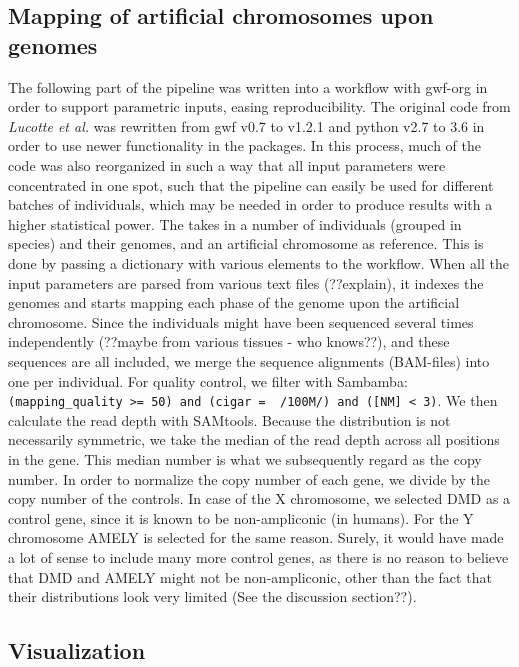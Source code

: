 \documentclass[
journal=jacsat, %
manuscript=article]{achemso}
\begin{document}
\normalsize


\subsection{Mapping of artificial chromosomes upon genomes}


The following part of the pipeline was written into a workflow with gwf-org\cite{gwforg} in order to support parametric inputs, easing reproducibility. The original code from \textit{Lucotte et al.\cite{LucotteDyn}} was rewritten from gwf v0.7 to v1.2.1 and python v2.7 to 3.6 in order to use newer functionality in the packages. In this process, much of the code was also reorganized in such a way that all input parameters were concentrated in one spot, such that the pipeline can easily be used for different batches of individuals, which may be needed in order to produce results with a higher statistical power. The takes in a number of individuals (grouped in species) and their genomes, and an artificial chromosome as reference. This is done by passing a dictionary with various elements to the workflow. When all the input parameters are parsed from various text files (??explain), it indexes the genomes and starts mapping each phase of the genome upon the artificial chromosome. Since the individuals might have been sequenced several times independently (??maybe from various tissues - who knows??), and these sequences are all included, we merge the sequence alignments (BAM-files) into one per individual. For quality control, we filter with Sambamba\cite{doi:10.1093/bioinformatics/btv098}: \texttt{(mapping\_quality >= 50) and (cigar =~ /100M/) and ([NM] < 3)}. We then calculate the read depth with SAMtools\cite{Li:2009:SAF:1613280.1613286}. Because the distribution is not necessarily symmetric, we take the median of the read depth across all positions in the gene. This median number is what we subsequently regard as the copy number. In order to normalize the copy number of each gene, we divide by the copy number of the controls. In case of the X chromosome, we selected DMD as a control gene, since it is known to be non-ampliconic (in humans). For the Y chromosome AMELY is selected for the same reason. Surely, it would have made a lot of sense to include many more control genes, as there is no reason to believe that DMD and AMELY might not be non-ampliconic, other than the fact that their distributions look very limited (See the discussion section??).

\subsection{Visualization}
\end{document}
